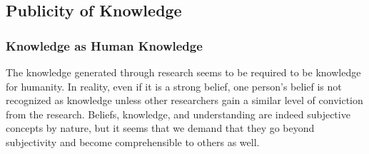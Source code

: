


\subsection{Publicity of Knowledge}
\subsubsection{Knowledge as Human Knowledge}
The knowledge generated through research seems to be required to be knowledge for humanity. In reality, even if it is a strong belief, one person's belief is not recognized as knowledge unless other researchers gain a similar level of conviction from the research. Beliefs, knowledge, and understanding are indeed subjective concepts by nature, but it seems that we demand that they go beyond subjectivity and become comprehensible to others as well. 

